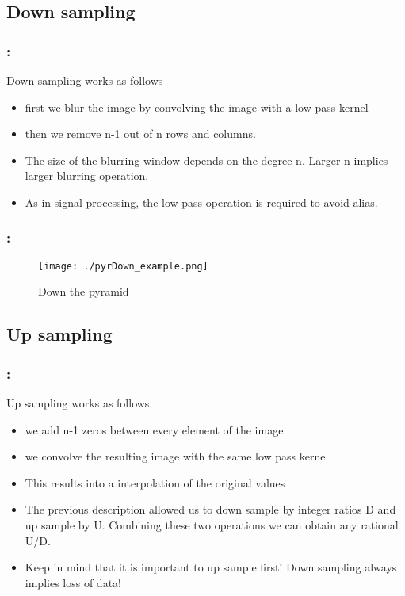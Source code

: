 \documentclass{beamer}
\begin{document}
\subsection{Down sampling}
\begin{frame}
  \frametitle{\secname : \subsecname}
  Down sampling works as follows
  \begin{itemize}
        \item first we blur the image by convolving the image with a low pass kernel
        \item then we remove n-1 out of n rows and columns.
        \item The size of the blurring window depends on the degree n. Larger n implies larger blurring operation. 
        \item As in signal processing, the low pass operation is required to avoid alias.
  \end{itemize}
\end{frame}

\begin{frame}
  \frametitle{\secname : \subsecname}
  \begin{figure}
    \centering
    \texttt{[image: ./pyrDown\_example.png]}
    \caption{Down the pyramid}
    \label{fig:pyr_down}
  \end{figure}
\end{frame}

\subsection{Up sampling}
\begin{frame}
  \frametitle{\secname : \subsecname}
  Up sampling works as follows
  \begin{itemize}
        \item we add n-1 zeros between every element of the image
        \item we convolve the resulting image with the same low pass kernel
        \item This results into a interpolation of the original values
        \item The previous description allowed us to down sample by integer ratios D and up sample by U. Combining these two operations
          we can obtain any rational U/D. 
        \item Keep in mind that it is important to up sample first! Down sampling always implies loss of data!
  \end{itemize}
\end{frame}
\end{document}
